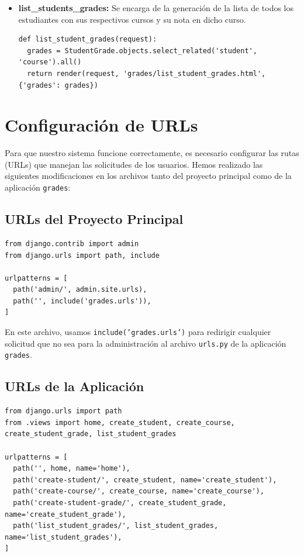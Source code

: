\documentclass[10pt, a4paper]{article}
\newcommand{\mpy}[1]{\texttt{#1}}
\begin{document}
\begin{itemize}
  \item \textbf{list\_students\_grades:} Se encarga de la generación de la lista de todos los estudiantes con sus respectivos cursos y su nota en dicho curso.

\begin{verbatim}
def list_student_grades(request):
  grades = StudentGrade.objects.select_related('student', 'course').all()
  return render(request, 'grades/list_student_grades.html', {'grades': grades})
\end{verbatim}

\end{itemize}

\section{Configuración de URLs}
Para que nuestro sistema funcione correctamente, es necesario configurar las rutas (URLs) que manejan las solicitudes de los usuarios. Hemos realizado las siguientes modificaciones en los archivos  tanto del proyecto principal como de la aplicación \mpy{grades}:

\subsection{URLs del Proyecto Principal}

\begin{verbatim}
from django.contrib import admin
from django.urls import path, include

urlpatterns = [
  path('admin/', admin.site.urls),
  path('', include('grades.urls')),
]
\end{verbatim}

En este archivo, usamos \mpy{include('grades.urls')} para redirigir cualquier solicitud que no sea para la administración al archivo \mpy{urls.py} de la aplicación \mpy{grades}.

\subsection{URLs de la Aplicación}
\begin{verbatim}
from django.urls import path
from .views import home, create_student, create_course, create_student_grade, list_student_grades

urlpatterns = [
  path('', home, name='home'),
  path('create-student/', create_student, name='create_student'),
  path('create-course/', create_course, name='create_course'),
  path('create-student-grade/', create_student_grade, name='create_student_grade'),
  path('list_student_grades/', list_student_grades, name='list_student_grades'),
]
\end{verbatim}
\end{document}
